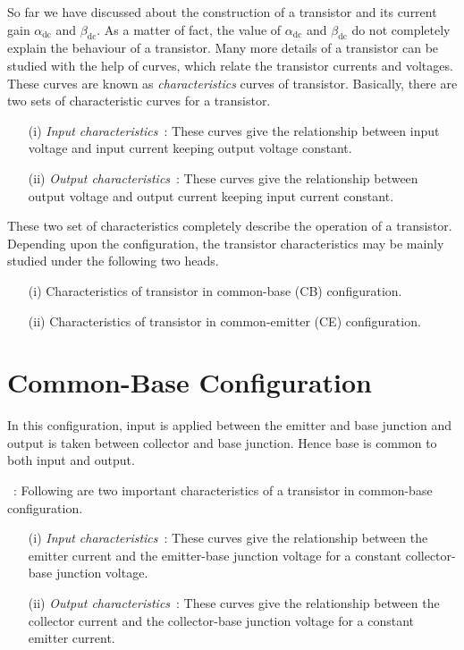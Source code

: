 So far we have discussed about the construction of a transistor and its current gain $\alpha_{\text{dc}}$ and $\beta_{\text{dc}}$. As a matter of fact, the value of $\alpha_{\text{dc}}$ and $\beta_{\text{dc}}$ do not completely explain the behaviour of a transistor. Many more details of a transistor can be studied with the help of curves, which relate the transistor currents and voltages. These curves are known as {\em characteristics} curves of transistor. Basically, there are two sets of characteristic curves for a transistor.
\begin{itemize}
\item[(i)] {\em Input characteristics}~: These curves give the relationship between input voltage and input current keeping output voltage constant.

\item[(ii)] {\em Output characteristics}~: These curves give the relationship between output voltage and output current keeping input current constant.
\end{itemize}

These two set of characteristics completely describe the operation of a transistor. Depending upon the configuration, the transistor characteristics may be mainly studied under the following two heads.
\begin{itemize}
\item[(i)] Characteristics of transistor in common-base (CB) configuration.

\item[(ii)] Characteristics of transistor in common-emitter (CE) configuration.
\end{itemize}

\newpage

\section{Common-Base Configuration}\label{sec2.4}

In this configuration, input is applied between the emitter and base junction and output is taken between collector and base junction. Hence base is common to both input and output.

~: Following are two important characteristics of a transistor in common-base configuration.
\begin{itemize}
\item[(i)] {\em Input characteristics}~: These curves give the relationship between the emitter current and the emitter-base junction voltage for a constant collector-base junction voltage.

\item[(ii)] {\em Output characteristics}~: These curves give the relationship between the collector current and the collector-base junction voltage for a constant emitter current.
\end{itemize}

